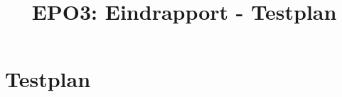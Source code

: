 \documentclass{scrartcl} %
\author{}
\title{EPO3: Eindrapport - Testplan}
\begin{document}
\chapter{Testplan}
\label{ch:testplan}
\end{document}
